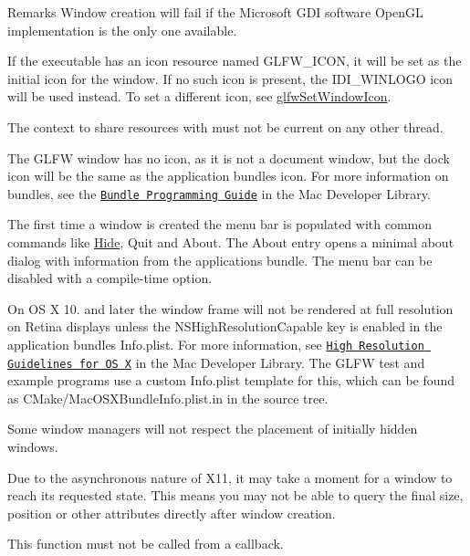 \begin{DoxyRemark}{Remarks}
Window creation will fail if the Microsoft G\+DI software Open\+GL implementation is the only one available.

If the executable has an icon resource named {\ttfamily G\+L\+F\+W\+\_\+\+I\+C\+ON,} it will be set as the initial icon for the window. If no such icon is present, the {\ttfamily I\+D\+I\+\_\+\+W\+I\+N\+L\+O\+GO} icon will be used instead. To set a different icon, see \hyperlink{group__window_ga182987a1a62a41a924842b9473d560df}{glfw\+Set\+Window\+Icon}.

The context to share resources with must not be current on any other thread.

The G\+L\+FW window has no icon, as it is not a document window, but the dock icon will be the same as the application bundle\textquotesingle{}s icon. For more information on bundles, see the \href{https://developer.apple.com/library/mac/documentation/CoreFoundation/Conceptual/CFBundles/}{\tt Bundle Programming Guide} in the Mac Developer Library.

The first time a window is created the menu bar is populated with common commands like \hyperlink{classHide}{Hide}, Quit and About. The About entry opens a minimal about dialog with information from the application\textquotesingle{}s bundle. The menu bar can be disabled with a compile-\/time option.

On OS X 10. and later the window frame will not be rendered at full resolution on Retina displays unless the {\ttfamily N\+S\+High\+Resolution\+Capable} key is enabled in the application bundle\textquotesingle{}s {\ttfamily Info.\+plist}. For more information, see \href{https://developer.apple.com/library/mac/documentation/GraphicsAnimation/Conceptual/HighResolutionOSX/Explained/Explained.html}{\tt High Resolution Guidelines for OS X} in the Mac Developer Library. The G\+L\+FW test and example programs use a custom {\ttfamily Info.\+plist} template for this, which can be found as {\ttfamily C\+Make/\+Mac\+O\+S\+X\+Bundle\+Info.\+plist.\+in} in the source tree.

Some window managers will not respect the placement of initially hidden windows.

Due to the asynchronous nature of X11, it may take a moment for a window to reach its requested state. This means you may not be able to query the final size, position or other attributes directly after window creation.
\end{DoxyRemark}
This function must not be called from a callback.

